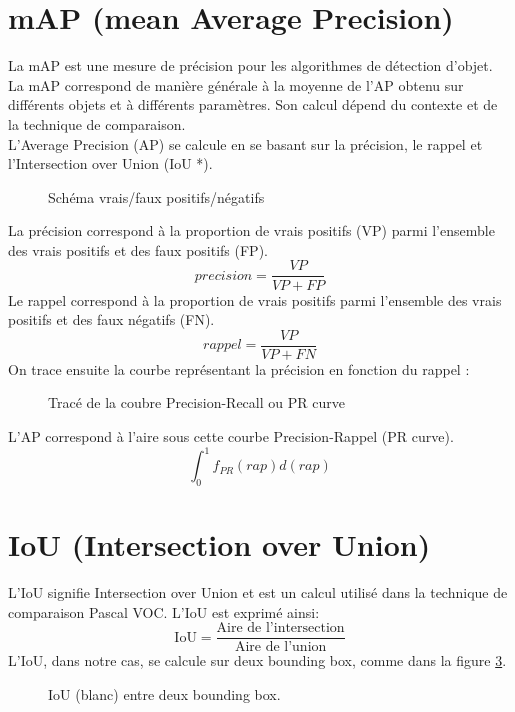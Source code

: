 \begin{appendices}
	
\section*{mAP (mean Average Precision)}\label{app:mAP}
La mAP est une mesure de précision pour les algorithmes de détection d'objet. La mAP correspond de manière générale à la moyenne de l'AP obtenu sur différents objets et à différents paramètres. Son calcul dépend du contexte et de la technique de comparaison.\\
L'Average Precision (AP) se calcule en se basant sur la précision, le rappel et l'Intersection over Union (IoU *). 
\begin{figure}[!htbp]
\center
\caption{Schéma vrais/faux positifs/négatifs}
\label{fig:schema_vraifaux}
\end{figure}
\FloatBarrier
La précision correspond à la proportion de vrais positifs (VP) parmi l'ensemble des vrais positifs et des faux positifs (FP). 
\[ precision = \frac{VP}{VP+FP} \]
Le rappel correspond à la proportion de vrais positifs parmi l'ensemble des vrais positifs et des faux négatifs (FN).
\[ rappel = \frac{VP}{VP+FN} \]
On trace ensuite la courbe représentant la précision en fonction du rappel : 
\begin{figure}[!htbp]
\center
\caption{Tracé de la coubre Precision-Recall ou PR curve}
\label{fig:trace_prcurve}
\end{figure}
\FloatBarrier
L'AP correspond à l'aire sous cette courbe Precision-Rappel (PR curve). 
\[ \int_{0}^{1} f_{PR}(rap)d(rap) \]	
	
\section*{IoU (Intersection over Union)}\label{app:IoU}
L'IoU signifie Intersection over Union et est un calcul utilisé dans la technique de comparaison Pascal VOC.
L'IoU est exprimé ainsi:
$$\text{IoU} = \frac{\text{Aire de l'intersection}}{\text{Aire de l'union}}$$
L'IoU, dans notre cas, se calcule sur deux bounding box, comme dans la figure \ref{fig:iou_example}.
\begin{figure}[!htbp]
\center
\caption{IoU (blanc) entre deux bounding box.}
\label{fig:iou_example}
\end{figure}
\FloatBarrier
	

\end{appendices}
